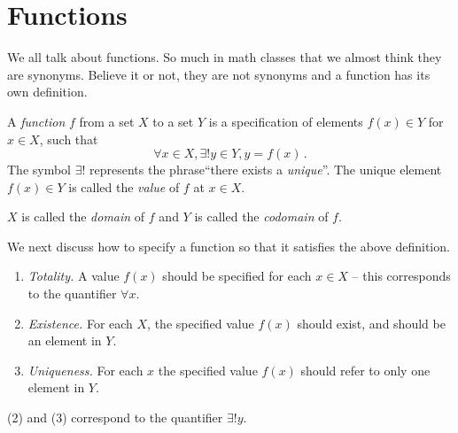 \section{Functions}

We all talk about functions.
So much in math classes that we  almost think they are synonyms.
Believe it or not, they are not synonyms and a function has its own definition.

\begin{definition}[Function]
    A \emph{function} $f$ from a set $X$ to a set $Y$ is a specification of elements
    $f(x)\in Y$ for $x\in X$, such that
    \begin{equation*}
        \forall x \in X, \exists! y \in Y, y = f(x)\,.
    \end{equation*}
    The symbol $\exists !$ represents the phrase``there exists a \emph{unique}''. 
    The unique element $f(x)\in Y$ is called the \emph{value} of $f$ at $x\in X$.

    $X$ is called the \emph{domain} of $f$ and $Y$ is called the \emph{codomain} of $f$.
\end{definition}

We next discuss how to specify a function so that it satisfies the above definition.

\begin{enumerate}
    \item \emph{Totality.} A value $f(x)$ should be specified for each $x\in X$ -- 
        this corresponds to the quantifier $\forall x$.
    \item \emph{Existence.} For each $X$, the specified value $f(x)$ should exist, and should be an element in $Y$.
    \item \emph{Uniqueness.} For each $x$ the specified value $f(x)$ should refer to only one 
        element in $Y$.
\end{enumerate}
(2) and (3) correspond to the quantifier $\exists ! y$.

